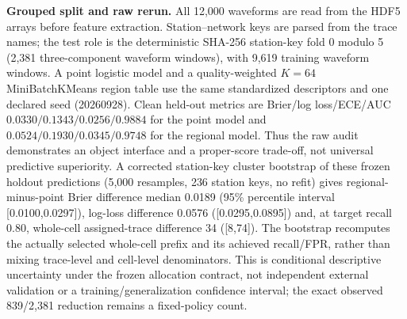 \documentclass[11pt,a4paper]{article}
\numberwithin{equation}{section}
\theoremstyle{definition}\newtheorem{definition}[theorem]{Definition}
\theoremstyle{remark}\newtheorem{remark}[theorem]{Remark}
\begin{document}
\textbf{Grouped split and raw rerun.} All 12,000 waveforms are read from the HDF5 arrays before feature extraction. Station--network keys are parsed from the trace names; the test role is the deterministic SHA-256 station-key fold 0 modulo 5 (2,381 three-component waveform windows), with 9,619 training waveform windows. A point logistic model and a quality-weighted $K=64$ MiniBatchKMeans region table use the same standardized descriptors and one declared seed (20260928). Clean held-out metrics are Brier/log loss/ECE/AUC $0.0330/0.1343/0.0256/0.9884$ for the point model and $0.0524/0.1930/0.0345/0.9748$ for the regional model. Thus the raw audit demonstrates an object interface and a proper-score trade-off, not universal predictive superiority. A corrected station-key cluster bootstrap of these frozen holdout predictions (5,000 resamples, 236 station keys, no refit) gives regional-minus-point Brier difference median 0.0189 (95\% percentile interval [0.0100,0.0297]), log-loss difference 0.0576 ([0.0295,0.0895]) and, at target recall 0.80, whole-cell assigned-trace difference 34 ([8,74]). The bootstrap recomputes the actually selected whole-cell prefix and its achieved recall/FPR, rather than mixing trace-level and cell-level denominators. This is conditional descriptive uncertainty under the frozen allocation contract, not independent external validation or a training/generalization confidence interval; the exact observed 839/2,381 reduction remains a fixed-policy count.
\end{document}
